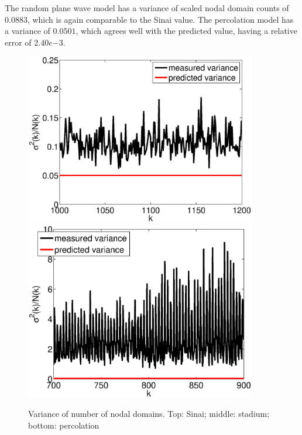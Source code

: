 \documentclass{report}
\begin{document}
The random plane wave model has a variance of scaled nodal domain counts of $0.0883$, which is again comparable to the Sinai value. The percolation model has a variance of $0.0501$, which agrees well with the predicted value, having a relative error of $2.40e{-3}$.

\begin{figure}
  \begin{center}
    \includegraphics[width=0.9\textwidth]{figs/results/qugrs_1000_to_1200_variance.eps}
    \includegraphics[width=0.9\textwidth]{figs/results/qust_700_to_900_variance.eps}

    \caption{Variance of number of nodal domains. Top: Sinai; middle: stadium; bottom: percolation}
    \label{fig:variance}
  \end{center}
\end{figure}
\end{document}
